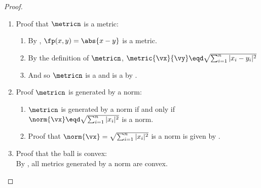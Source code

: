 \begin{proof}
\begin{enumerate}
  \item Proof that $\metricn$ is a metric:
    \begin{enumerate}
      \item By , $\fp(x,y)=\abs{x-y}$ is a metric.
      \item By the definition of $\metricn$, 
            $\metric{\vx}{\vy} \eqd \sqrt{\sum_{i=1}^n |x_i-y_i|^2}$
      \item And so $\metricn$ is a  and is a  by .

    \end{enumerate}

  \item Proof $\metricn$ is generated by a norm: 
    \begin{enumerate}
      \item $\metricn$ is generated by a norm if and only if
            $\norm{\vx}\eqd\sqrt{\sum_{i=1}^n |x_i|^2}$ is a norm.
      \item Proof that $\norm{\vx}=\sqrt{\sum_{i=1}^n |x_i|^2}$ is a norm
            is given by .
    \end{enumerate}

  \item Proof that the ball is convex: \\
    By , all metrics generated by a norm are convex.
\end{enumerate}
\end{proof}





